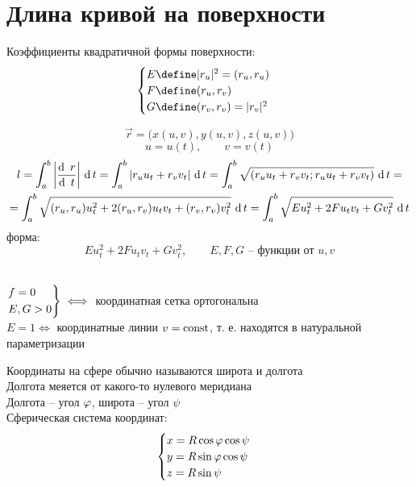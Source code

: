 \section{Длина кривой на поверхности}

\begin{definition}
	Коэффициенты  квадратичной формы поверхности:
	$$
	\begin{cases}
		E \define |r_u|^2 = (r_u, r_u) \\
		F \define (r_u, r_v) \\
		G \define (r_v, r_v) = |r_v|^2
	\end{cases} $$
\end{definition}

$$ \vec{r} = \bigg( x(u, v), y(u, v), z(u, v) \bigg) $$
$$ u = u(t), \qquad v = v(t) $$
\begin{multline*}
	l = \dint[t]ab{\bigg| \frac{\di r}{\di t} \bigg|} = \dint[t]ab{|r_uu_t + r_vv_t|} = \dint[t]ab{\sqrt{(r_uu_t + r_vv_t; r_uu_t + r_vv_t)}} = \\
	= \dint[t]ab{\sqrt{(r_u, r_u)u_t^2 + 2(r_u, r_v)u_tv_t + (r_v, r_v)v_t^2}} = \dint[t]ab{\sqrt{Eu_t^2 + 2Fu_tv_t + Gv_t^2}}
\end{multline*}
 форма:
$$ Eu_t^2 + 2Fu_tv_t + Gv_t^2, \qquad E, F, G \text{ -- функции от } u, v $$

\begin{remark}
	\hfill \\
	$
	\begin{rcases}
		f = 0 \\
		E, G > 0
	\end{rcases} \iff $ координатная сетка ортогональна \\
	$ E = 1 \iff $ координатные линии $ v = \operatorname{const} $, т. е. находятся в натуральной параметризации
\end{remark}

\begin{eg}
	Координаты на сфере обычно называются широта и долгота \\
	Долгота меяется от какого-то нулевого меридиана \\
	Долгота -- угол $ \varphi $, широта -- угол $ \psi $ \\
	Сферическая система координат:
	$$
	\begin{cases}
		x = R\cos\varphi\cos\psi \\
		y = R\sin\varphi\cos\psi \\
		z = R\sin\psi
	\end{cases} $$
\end{eg}
